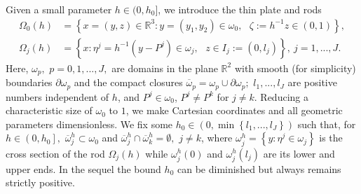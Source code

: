 \documentclass[11pt]{article}%
\numberwithin{equation}{section}
\begin{document}
Given a small parameter $h\in(0,h_{0}]$, we introduce the thin plate and rods%
\begin{align}
\Omega_{0}\left(  h\right)   &  =\left\{  x=\left(  y,z\right)  \in
\mathbb{R}^{3}:y=(y_{1},y_{2})\in\mathbb{\omega}_{0},\text{ }\zeta:=h^{-1}%
z\in\left(  0,1\right)  \right\}  ,\label{1}\\
\Omega_{j}\left(  h\right)   &  =\left\{  x:\eta^{j}=h^{-1}\left(
y-P^{j}\right)  \in\mathbb{\omega}_{j},\text{ \ }z\in I_{j}:=(0,l_{j}%
)\right\}  ,\ j=1,...,J. \label{2}%
\end{align}
Here, $\omega_{p},$ $p=0,1,...,J,$ are domains in the plane $\mathbb{R}^{2}$
with smooth (for simplicity) boundaries $\partial\mathbb{\omega}_{p}$ and the
compact closures $\overline{\mathbb{\omega}}_{p}=\mathbb{\omega}_{p}%
\cup\partial\mathbb{\omega}_{p};$ $l_{1},...,l_{J}$ are positive numbers
independent of $h$, and $P^{j}\in\omega_{0}$, $P^{j}\neq P^{k}$ for $j\neq k$.
Reducing a characteristic size of $\mathbb{\omega}_{0}$ to $1$, we make
Cartesian coordinates and all geometric parameters dimensionless. We fix some
$h_{0}\in(0,\min\left\{  l_{1},...,l_{J}\right\}  )$ such that, for
$h\in\left(  0,h_{0}\right]  ,$ $\overline{\mathbb{\omega}}_{j}^{h}%
\subset\mathbb{\omega}_{0}$ and $\overline{\mathbb{\omega}}_{j}^{h}%
\cap\overline{\mathbb{\omega}}_{k}^{h}=\emptyset,$ $j\neq k$, where
$\mathbb{\omega}_{j}^{h}=\left\{  y:\eta^{j}\in\mathbb{\omega}_{j}\right\}  $
is the cross section of the rod $\Omega_{j}\left(  h\right)  $ while
$\mathbb{\omega}_{j}^{h}(0)$ and $\mathbb{\omega}_{j}^{h}(l_{j})$ are its
lower and upper ends. In the sequel the bound $h_{0}$ can be diminished but
always remains strictly positive.
\end{document}
